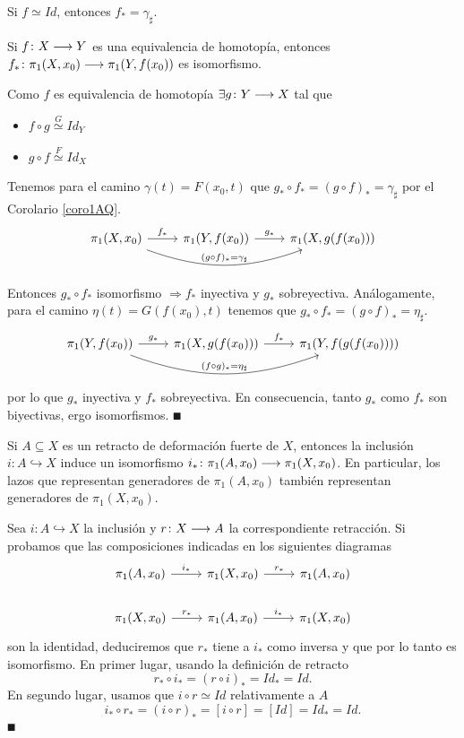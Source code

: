 \documentclass[GTS.tex]{subfiles}
\begin{document}
\begin{coro}\label{coro1AQ}
Si $f\simeq Id$, entonces $f_*=\gamma_\sharp$.
\end{coro}
\begin{coro}
Si $f\colon{X}\longrightarrow{Y}$ es una equivalencia de homotopía, entonces $f_*\colon{\pi_1(X,x_0)}\longrightarrow{\pi_1(Y,f(x_0))}$ es isomorfismo.
\end{coro}
\begin{dem}
Como $f$ es equivalencia de homotopía $\exists g\colon{Y}\longrightarrow{X}$ tal que
\begin{itemize}

\item $f\circ g\overset{G}{\simeq}Id_Y$
\item $g\circ f\overset{F}{\simeq}Id_X$
\end{itemize}
Tenemos para el camino $\gamma(t)=F(x_0,t)$ que $g_*\circ f_*=(g\circ f)_*=\gamma_\sharp$ por el Corolario \ref{coro1AQ}.
\[
\begin{tikzcd}
\pi_1(X,x_0)\arrow[r, "f_*"]\arrow[rr, "(g\circ f)_*=\gamma_\sharp", bend right=20] &  \pi_1(Y,f(x_0))\arrow[r,"g_*"] & \pi_1(X,g(f(x_0)))
\end{tikzcd}
\]

Entonces $g_*\circ f_*$ isomorfismo $\Rightarrow f_*$ inyectiva y $g_*$ sobreyectiva. Análogamente, para el camino $\eta(t)=G(f(x_0),t)$ tenemos que $g_*\circ f_*=(g\circ f)_*=\eta_\sharp$.
\[
\begin{tikzcd}
\pi_1(Y,f(x_0))\arrow[r, "g_*"]\arrow[rr, "(f\circ g)_*=\eta_\sharp", bend right=20] & \pi_1(X,g(f(x_0))) \arrow[r,"f_*"] & \pi_1(Y,f(g(f(x_0))))
\end{tikzcd}
\]
por lo que $g_*$ inyectiva y $f_*$ sobreyectiva. En consecuencia, tanto $g_*$ como $f_*$ son biyectivas, ergo isomorfismos. $\QED$

\end{dem}

\begin{coro}
Si $A\subseteq X$ es un retracto de deformación fuerte de $X$, entonces la inclusión $i:A\hookrightarrow X$ induce un isomorfismo $i_*\colon{\pi_1(A,x_0)}\longrightarrow{\pi_1(X,x_0)}$. En particular, los lazos que representan generadores de $\pi_1(A,x_0)$ también representan generadores de $\pi_1(X,x_0)$.
\end{coro}

\begin{dem}
Sea $i:A\hookrightarrow X$ la inclusión y $r\colon{X}\longrightarrow{A}$ la correspondiente retracción. Si probamos que las composiciones indicadas en los siguientes diagramas
\[
\begin{tikzcd}
\pi_1(A,x_0)\arrow[r, "i_*"] & \pi_1(X,x_0)\arrow[r, "r_*"] & \pi_1(A,x_0)\\
\pi_1(X,x_0)\arrow[r, "r_*"] & \pi_1(A,x_0)\arrow[r, "i_*"] & \pi_1(X,x_0)
\end{tikzcd}
\]
son la identidad, deduciremos que $r_*$ tiene a $i_*$ como inversa y que por lo tanto es isomorfismo. En primer lugar, usando la definición de retracto
\[
r_*\circ i_*=(r\circ i)_*=Id_*=Id.
\]
En segundo lugar, usamos que $i\circ r\simeq Id$ relativamente a $A$
\[
i_*\circ r_*=(i\circ r)_*=[i\circ r]=[Id]=Id_*=Id.
\]$\QED$
\end{dem}
\end{document}

